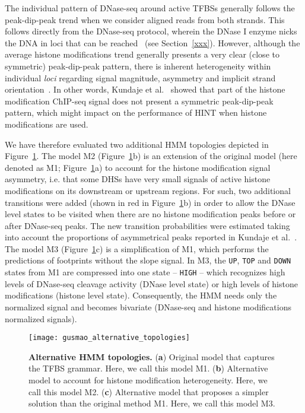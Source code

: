 The individual pattern of DNase-seq around active TFBSs generally follows the peak-dip-peak trend when we consider aligned reads from both strands. This follows directly from the DNase-seq protocol, wherein the DNase I enzyme nicks the DNA in loci that can be reached~\cite{crawford2006b,song2010,boyle2011} (see Section~\ref{xxx}). However, although the average histone modifications trend generally presents a very clear (close to symmetric) peak-dip-peak pattern, there is inherent heterogeneity within individual \emph{loci} regarding signal magnitude, asymmetry and implicit strand orientation~\cite{kundaje2012,encode2012}. In other words, Kundaje et al.~\cite{kundaje2012} showed that part of the histone modification ChIP-seq signal does not present a symmetric peak-dip-peak pattern, which might impact on the performance of HINT when histone modifications are used.

We have therefore evaluated two additional HMM topologies depicted in Figure~\ref{fig:gusmao_alternative_topologies}. The model M2 (Figure~\ref{fig:gusmao_alternative_topologies}b) is an extension of the original model (here denoted as M1; Figure~\ref{fig:gusmao_alternative_topologies}a) to account for the histone modification signal asymmetry, i.e. that some DHSs have very small signals of active histone modifications on its downstream or upstream regions. For such, two additional transitions were added (shown in red in Figure~\ref{fig:gusmao_alternative_topologies}b) in order to allow the DNase level states to be visited when there are no histone modification peaks before or after DNase-seq peaks. The new transition probabilities were estimated taking into account the proportions of asymmetrical peaks reported in Kundaje et al.~\cite{kundaje2012}. The model M3 (Figure~\ref{fig:gusmao_alternative_topologies}c) is a simplification of M1, which performs the predictions of footprints without the slope signal. In M3, the {\tt UP}, {\tt TOP} and {\tt DOWN} states from M1 are compressed into one state -- {\tt HIGH} -- which recognizes high levels of DNase-seq cleavage activity (DNase level state) or high levels of histone modifications (histone level state). Consequently, the HMM needs only the normalized signal and becomes bivariate (DNase-seq and histone modifications normalized signals).

\begin{figure}[h!]
\centering
\texttt{[image: gusmao\_alternative\_topologies]}
\caption[Alternative HMM topologies]{\textbf{Alternative HMM topologies.} (\textbf{a}) Original model that captures the TFBS grammar. Here, we call this model M1. (\textbf{b}) Alternative model to account for histone modification heterogeneity. Here, we call this model M2. (\textbf{c}) Alternative model that proposes a simpler solution than the original method M1. Here, we call this model M3.}
\label{fig:gusmao_alternative_topologies}
\end{figure}

